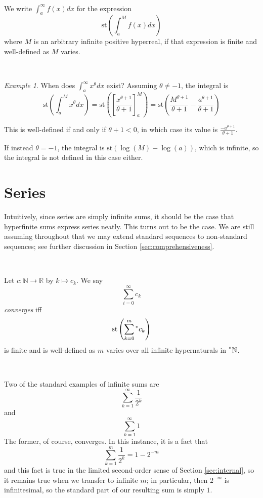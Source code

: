 \documentclass[11pt]{amsart}
\theoremstyle{remark}
\newtheorem*{example}{Example}
\newcommand{\st}{\mathrm{st}}
\newcommand{\hyp}[1][\mathbb{R}]{\prescript{*}{}{#1}}
\begin{document}
\

\begin{defn}
We write $\int_a^{\infty} f(x) dx$ for the expression $$\st \left( \int_a^M f(x) dx \right)$$
where $M$ is an arbitrary infinite positive hyperreal, if that expression is finite and well-defined as $M$ varies.
\end{defn}

\

\begin{example}
When does $\int_a^{\infty} x^{\theta} dx$ exist?
Assuming $\theta \not = -1$, the integral is $$\st \left( \int_a^M x^{\theta} dx \right) = \st \left( \left[\frac{x^{\theta + 1}}{\theta + 1} \right]_a^{M} \right) = \st \left( \frac{M^{\theta+1}}{\theta+1} - \frac{a^{\theta+1}}{\theta+1} \right)$$

This is well-defined if and only if $\theta+1 < 0$, in which case its value is $\frac{-a^{\theta+1}}{\theta+1}$.

If instead $\theta = -1$, the integral is $\st(\log(M) - \log(a))$, which is infinite, so the integral is not defined in this case either.
\end{example}

\section{Series}

Intuitively, since series are simply infinite sums, it should be the case that hyperfinite sums express series neatly.
This turns out to be the case.
We are still assuming throughout that we may extend standard sequences to non-standard sequences; see further discussion in Section \ref{sec:comprehensiveness}.

\

\begin{defn} Let $c: \mathbb{N} \to \mathbb{R}$ by $k \mapsto c_k$. 
We say $$\sum_{i=0}^{\infty} c_k$$ \emph{converges} iff $$\st \left( \sum_{k=0}^m \hyp[c]_k \right)$$ is finite and is well-defined as $m$ varies over all infinite hypernaturals in $\hyp[\mathbb{N}]$.
\end{defn}

\

Two of the standard examples of infinite sums are $$\sum_{k=1}^{\infty} \frac{1}{2^k}$$ and $$\sum_{k=1}^{\infty} 1$$
The former, of course, converges.
In this instance, it is a fact that $$\sum_{k=1}^{m} \frac{1}{2^k} = 1-2^{-m}$$
and this fact is true in the limited second-order sense of Section \ref{sec:internal},
so it remains true when we transfer to infinite $m$; in particular, then $2^{-m}$ is infinitesimal, so the standard part of our resulting sum is simply $1$.
\end{document}

